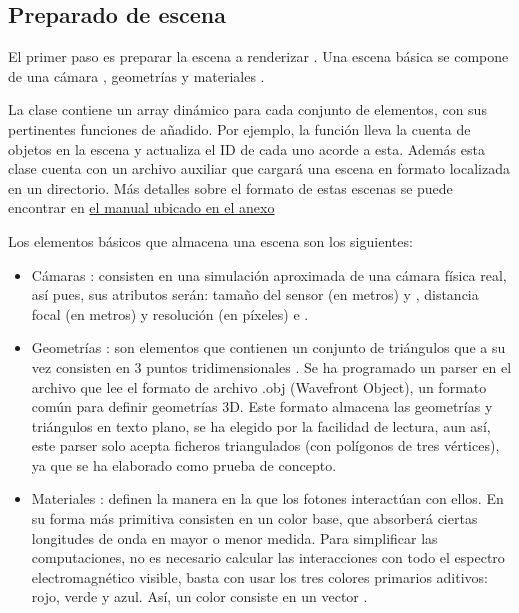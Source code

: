 \subsection{Preparado de escena}

El primer paso es preparar la escena a renderizar . Una escena básica se compone de una cámara , geometrías  y materiales .

La clase  contiene un array dinámico para cada conjunto de elementos, con sus pertinentes funciones de añadido. Por ejemplo, la función  lleva la cuenta de objetos en la escena y actualiza el ID de cada uno acorde a esta. Además esta clase cuenta con un archivo auxiliar  que cargará una escena en formato  localizada en un directorio. Más detalles sobre el formato de estas escenas se puede encontrar en \hyperref[sceneformat]{el manual ubicado en el anexo}

Los elementos básicos que almacena una escena son los siguientes:

\begin{itemize}

\item Cámaras : consisten en una simulación aproximada de una cámara física real, así pues, sus atributos serán: tamaño del sensor (en metros)  y , distancia focal (en metros)  y resolución (en píxeles)  e . 

\item Geometrías : son elementos que contienen un conjunto de triángulos  que a su vez consisten en 3 puntos tridimensionales . Se ha programado un parser en el archivo  que lee el formato de archivo .obj (Wavefront Object), un formato común para definir geometrías 3D. Este formato almacena las geometrías y triángulos en texto plano, se ha elegido por la facilidad de lectura, aun así, este parser solo acepta ficheros  triangulados (con polígonos de tres vértices), ya que se ha elaborado como prueba de concepto.

\item Materiales : definen la manera en la que los fotones interactúan con ellos. En su forma más primitiva consisten en un color base, que absorberá ciertas longitudes de onda en mayor o menor medida. Para simplificar las computaciones, no es necesario calcular las interacciones con todo el espectro electromagnético visible, basta con usar los tres colores primarios aditivos: rojo, verde y azul. Así, un color consiste en un vector .

\end{itemize}

